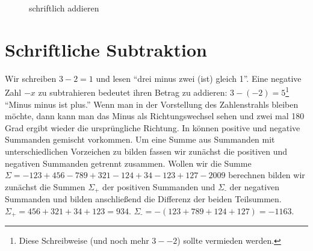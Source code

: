 \documentclass[a4paper]{book}%
\theoremstyle{definition}
\begin{document}
\begin{figure}
  \caption{schriftlich addieren}\label{fig:schriftlichAddieren}
\end{figure}


\section{Schriftliche Subtraktion}

Wir schreiben $3-2=1$ und lesen \enquote{drei minus zwei (ist) gleich 1}. Eine negative Zahl $-x$ zu subtrahieren bedeutet ihren Betrag zu addieren: $3 - (-2) = 5$\footnote{Diese Schreibweise (und noch mehr $3--2$) sollte vermieden werden.} \enquote{Minus minus ist plus.} Wenn man in der Vorstellung des Zahlenstrahls bleiben möchte, dann kann man das Minus als Richtungswechsel sehen und zwei mal 180 Grad ergibt wieder die ursprüngliche Richtung. In  können positive und negative Summanden gemischt vorkommen. Um eine Summe aus Summanden mit unterschiedlichen Vorzeichen zu bilden fassen wir zunächst die positiven und negativen Summanden getrennt zusammen. Wollen wir die Summe $\Sigma = -123 +456 -789 +321 -124 +34 -123 +127 -2009$ berechnen bilden wir zunächst die Summen $\Sigma_{\text{+}}$ der positiven Summanden und $\Sigma_{\text{-}}$ der negativen Summanden und bilden anschließend die Differenz der beiden Teilsummen. $\Sigma_{\text{+}} = 456 + 321 + 34 + 123 = 934$. $\Sigma_{\text{-}} = -(123 + 789 + 124 + 127) = -1163$.
\end{document}
